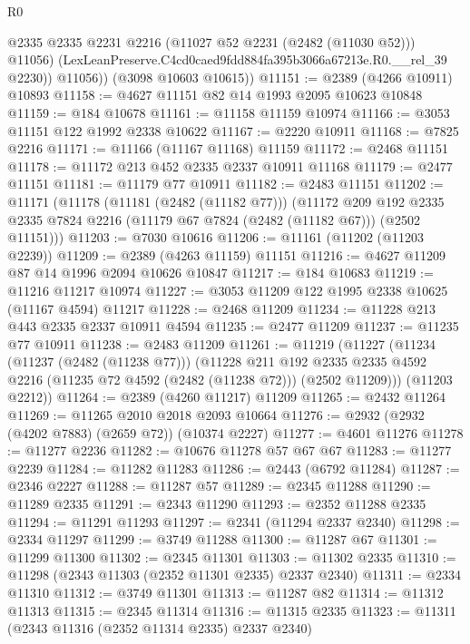 \begin{lexlean}{R0}
\begin{coremodule}
              @2335
              @2335
              @2231
              @2216
              (@11027 @52 @2231 (@2482 (@11030 @52)))
              @11056)
            (LexLeanPreserve.C4cd0caed9fdd884fa395b3066a67213e.R0.__rel_39 @2230))
          @11056))
      (@3098 @10603 @10615))
@11151 := @2389 (@4266 @10911) @10893
@11158 := @4627 @11151 @82 @14 @1993 @2095 @10623 @10848
@11159 := @184 @10678
@11161 := @11158 @11159 @10974
@11166 := @3053 @11151 @122 @1992 @2338 @10622
@11167 := @2220 @10911
@11168 := @7825 @2216
@11171 := @11166 (@11167 @11168) @11159
@11172 := @2468 @11151
@11178 := @11172 @213 @452 @2335 @2337 @10911 @11168
@11179 := @2477 @11151
@11181 := @11179 @77 @10911
@11182 := @2483 @11151
@11202 := @11171
    (@11178
      (@11181 (@2482 (@11182 @77)))
      (@11172
        @209
        @192
        @2335
        @2335
        @7824
        @2216
        (@11179 @67 @7824 (@2482 (@11182 @67)))
        (@2502 @11151)))
@11203 := @7030 @10616
@11206 := @11161 (@11202 (@11203 @2239))
@11209 := @2389 (@4263 @11159) @11151
@11216 := @4627 @11209 @87 @14 @1996 @2094 @10626 @10847
@11217 := @184 @10683
@11219 := @11216 @11217 @10974
@11227 := @3053 @11209 @122 @1995 @2338 @10625 (@11167 @4594) @11217
@11228 := @2468 @11209
@11234 := @11228 @213 @443 @2335 @2337 @10911 @4594
@11235 := @2477 @11209
@11237 := @11235 @77 @10911
@11238 := @2483 @11209
@11261 := @11219
    (@11227
      (@11234
        (@11237 (@2482 (@11238 @77)))
        (@11228
          @211
          @192
          @2335
          @2335
          @4592
          @2216
          (@11235 @72 @4592 (@2482 (@11238 @72)))
          (@2502 @11209)))
      (@11203 @2212))
@11264 := @2389 (@4260 @11217) @11209
@11265 := @2432 @11264
@11269 := @11265 @2010 @2018 @2093 @10664
@11276 := @2932 (@2932 (@4202 @7883) (@2659 @72)) (@10374 @2227)
@11277 := @4601 @11276
@11278 := @11277 @2236
@11282 := @10676 @11278 @57 @67 @67
@11283 := @11277 @2239
@11284 := @11282 @11283
@11286 := @2443 (@6792 @11284)
@11287 := @2346 @2227
@11288 := @11287 @57
@11289 := @2345 @11288
@11290 := @11289 @2335
@11291 := @2343 @11290
@11293 := @2352 @11288 @2335
@11294 := @11291 @11293
@11297 := @2341 (@11294 @2337 @2340)
@11298 := @2334 @11297
@11299 := @3749 @11288
@11300 := @11287 @67
@11301 := @11299 @11300
@11302 := @2345 @11301
@11303 := @11302 @2335
@11310 := @11298 (@2343 @11303 (@2352 @11301 @2335) @2337 @2340)
@11311 := @2334 @11310
@11312 := @3749 @11301
@11313 := @11287 @82
@11314 := @11312 @11313
@11315 := @2345 @11314
@11316 := @11315 @2335
@11323 := @11311 (@2343 @11316 (@2352 @11314 @2335) @2337 @2340)

\end{coremodule}
\end{lexlean}
